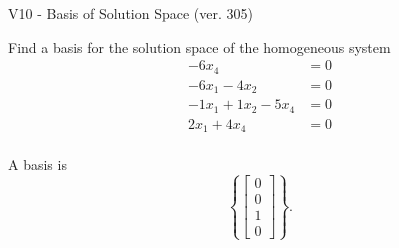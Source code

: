 \begin{exercise}
  \begin{exerciseTitle}V10 - Basis of Solution Space (ver. 305)\end{exerciseTitle}
  \begin{exerciseStatement}
    Find a basis for the solution space of the homogeneous system 
\begin{align*}
 -6 x_ 4 &= 0  \\ 
  -6 x_ 1 -4 x_ 2 &= 0  \\ 
  -1 x_ 1 + 1 x_ 2 -5 x_ 4 &= 0  \\ 
  2 x_ 1 + 4 x_ 4 &= 0  \\ 
 \end{align*}


 
  \end{exerciseStatement}

  \begin{exerciseAnswer}
   A basis is   
\[\left\{\left[\begin{array}{c}
0 \\
0 \\
1 \\
0
\end{array}\right]\right\}.\]

  


  \end{exerciseAnswer}
\end{exercise}